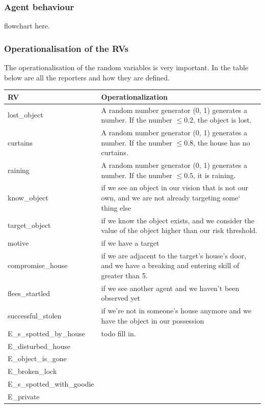 \subsubsection{Agent behaviour}
flowchart here.

\subsubsection{Operationalisation of the RVs}

The operationalisation of the random variables is very important. In the table below are all the reporters and how they are defined.

\begin{adjustbox}{center}
\footnotesize
\centering
\begin{tabular}{|l|l|}
 \hline
 RV &Operationalization\\
 \hline
lost\_object   & A random number generator (0, 1) generates a number. If the number $\leq 0.2$, the object is lost.\\
curtains & A random number generator (0, 1) generates a number. If the number $\leq 0.8$, the house has no curtains.  \\
raining & A random number generator (0, 1) generates a number. If the number $\leq 0.5$, it is raining.   \\
know\_object & if we see an object in our vision that is not our own, and we are not already targeting some`
thing else  \\
target\_object & if we know the object exists, and we consider the value of the object higher than our risk threshold.  \\
motive & if we have a target \\
compromise\_house & if we are adjacent to the target's house's door, and we have a breaking and entering skill of greater than 5. \\
flees\_startled & if we see another agent and we haven't been observed yet  \\
successful\_stolen & if we're not in someone's house anymore and we have the object in our possession \\ 
E\_s\_spotted\_by\_house&  {\color{red} todo fill in}. \\ 
E\_disturbed\_house&   \\ 
E\_object\_is\_gone&   \\ 
E\_broken\_lock&   \\ 
E\_s\_spotted\_with\_goodie&   \\ 
E\_private&   \\ 
\hline
\end{tabular}
\end{adjustbox}

